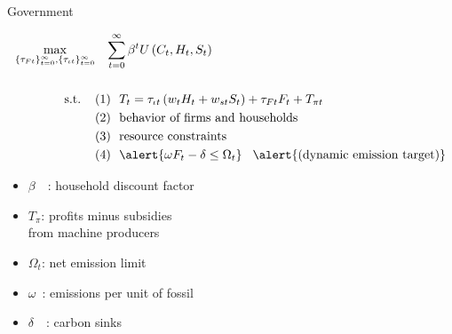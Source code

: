 \documentclass[11pt,aspectratio=169]{beamer}
\begin{document}
\addtocounter{framenumber}{-1}

\begin{frame}{ Government}
\hypertarget{gov}{}
\vspace{-4mm}
\centering
\begin{minipage}[t!]{1\textwidth}
	\begin{align*}
		\max_{\{\tau_{Ft}\}_{t=0}^{\infty}, \{\tau_{\iota t}\}_{t=0}^{\infty}}&\hspace{3mm} \sum_{t=0}^{\infty}\beta^t U\left(C_t,H_t, S_t\right)\\ \ \\
		\text{s.t.} \hspace{4mm}
		&{ (1)\ \ T_t=\tau_{\iota t}\left(w_{t}H_{t}+w_{st}S_{t}\right)+{{\tau_{Ft}}}F_{t}}+T_{\pi t}\\
		& {(2)\ \  \text{behavior of firms and households}}\\
		& {(3)\ \ \text{resource constraints} }\\
		&{(4)\ \  \alert{\omega F_t-\delta \leq\Omega_t }} \hspace{3mm} \alert{\text{(dynamic emission target)}}
	\end{align*}
\end{minipage}

\small
\vspace{0mm}
\hspace{-10mm}
\begin{minipage}[t!]{0.5\textwidth}
	\vspace{7mm}
	\begin{itemize}
		\item[] $\beta$\ \ : household discount factor\vspace{-2mm}
		\item[] $T_\pi$: profits minus subsidies \\ \hspace{5.5mm} from machine producers \vspace{0mm}
	\end{itemize}
\end{minipage}
\begin{minipage}[t!]{0.45\textwidth}
	\vspace{8mm}
	\begin{itemize}
		\item[] $\Omega_{t}$: net emission limit
		\vspace{-2mm}	
		\item[] $\omega$\ : emissions per unit of fossil \vspace{-0.8mm}
		\item[] $\delta$\ \ : carbon sinks \tiny{\citep{VanVuuren2018AlternativeTechnologies}}
	\end{itemize}
\end{minipage}

\end{frame}
\end{document}
